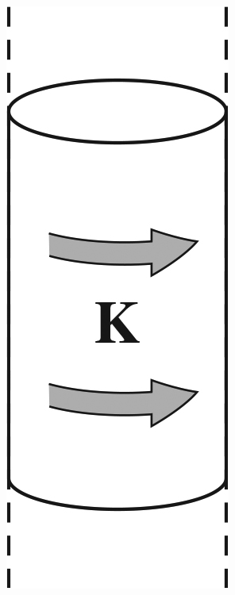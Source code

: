 \documentclass[12pt]{article}
\begin{document}
\begin{figure}[ht]
\begin{subfigure}{0.07\textwidth}
\includegraphics[width=\textwidth]{figures/5_35.jpg}

\end{subfigure}
\end{figure}
\end{document}
